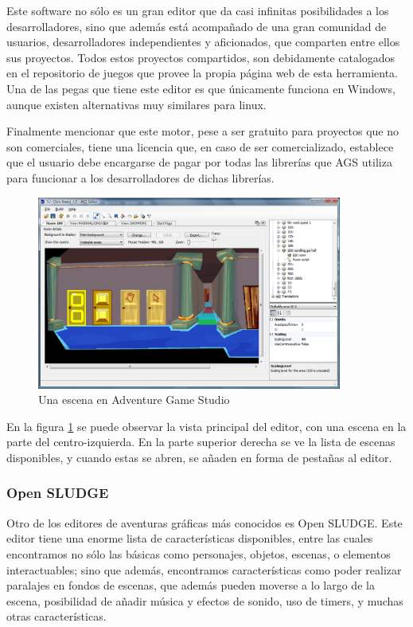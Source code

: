 Este software no sólo es un gran editor que da casi infinitas posibilidades a los desarrolladores, sino que además está acompañado de una gran comunidad de usuarios, desarrolladores independientes y aficionados, que comparten entre ellos sus proyectos. Todos estos proyectos compartidos, son debidamente catalogados en el repositorio de juegos que provee la propia página web de esta herramienta. Una de las pegas que tiene este editor es que únicamente funciona en Windows, aunque existen alternativas muy similares para linux.

Finalmente mencionar que este motor, pese a ser gratuito para proyectos que no son comerciales, tiene una licencia que, en caso de ser comercializado, establece que el usuario debe encargarse de pagar por todas las librerías que AGS utiliza para funcionar a los desarrolladores de dichas librerías.

\begin{figure}[htb]
    \includegraphics[height=2.5in]{figures/ags.png}
    \caption[Adventure Game Studio]{Una escena en Adventure Game Studio}
    \label{agsfigure}
\end{figure}

En la figura \ref{agsfigure} se puede observar la vista principal del editor, con una escena en la parte del centro-izquierda. En la parte superior derecha se ve la lista de escenas disponibles, y cuando estas se abren, se añaden en forma de pestañas al editor.

\subsubsection{Open SLUDGE}
\label{opensludge}

Otro de los editores de aventuras gráficas más conocidos es Open SLUDGE. Este editor tiene una enorme lista de características disponibles, entre las cuales encontramos no sólo las básicas como personajes, objetos, escenas, o elementos interactuables; sino que además, encontramos características como poder realizar paralajes en fondos de escenas, que además pueden moverse a lo largo de la escena, posibilidad de añadir música y efectos de sonido, uso de timers, y muchas otras características.

